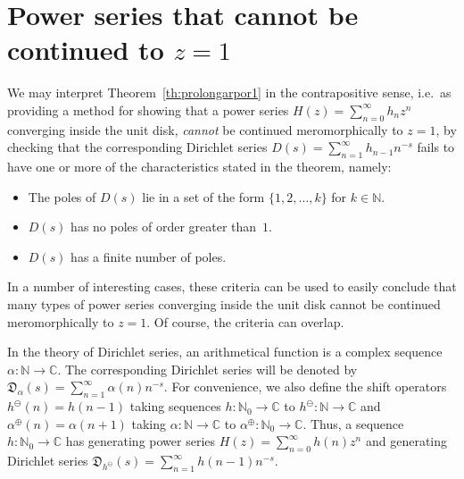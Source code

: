\documentclass[11pt,a4paper]{amsart}
\newcommand{\N}{\mathbb{N}}
\newcommand{\C}{\mathbb{C}}
\newcommand{\D}{\mathfrak{D}}
\newcommand{\decr}{\ominus}
\newcommand{\incr}{\oplus}
\theoremstyle{plain}
\theoremstyle{plain}
\theoremstyle{plain}
\theoremstyle{definition}
\theoremstyle{remark}
\begin{document}
\section{Power series that cannot be continued to $z=1$}
\label{sec:power}

We may interpret Theorem~\ref{th:prolongarpor1} in the contrapositive sense, i.e.\ as providing a method for showing that a power series $H(z) = \sum_{n=0}^{\infty} h_{n} z^{n}$ converging inside the unit disk, \emph{cannot} be continued meromorphically to $z=1$, by checking that the corresponding Dirichlet series $D(s) = \sum_{n=1}^{\infty} h_{n-1} n^{-s}$ fails to have one or more of the characteristics stated in the theorem, namely:
\begin{itemize}

\item The poles of $D(s)$ lie in a set of the form $\{1,2,\dots,k\}$ for $k \in \N$.

\item $D(s)$ has no poles of order greater than~$1$.

\item $D(s)$ has a finite number of poles.

\end{itemize}

In a number of interesting cases, these criteria can be used to easily conclude that many types of power series converging inside the unit disk cannot be continued meromorphically to $z=1$. Of course, the criteria can overlap.


In the theory of Dirichlet series, an arithmetical function is a complex sequence $\alpha : \N \to \C$. The corresponding Dirichlet series will be denoted by
\(
  \D_{\alpha}(s) = \sum_{n=1}^{\infty} \alpha(n) n^{-s}.
\)
For convenience, we also define the shift operators $h^{\decr}(n) = h(n-1)$ taking sequences $h : \N_{0} \to \C$ to $h^{\decr} : \N \to \C$ and $\alpha^{\incr}(n) = \alpha(n+1)$ taking $\alpha : \N \to \C$ to $\alpha^{\incr} : \N_{0} \to \C$. Thus, a sequence $h: \N_{0} \to \C$ has generating power series $H(z) = \sum_{n=0}^{\infty} h(n) z^{n}$ and generating Dirichlet series $\D_{h^{\decr}}(s) = \sum_{n=1}^{\infty} h(n-1) n^{-s}$.
\end{document}
